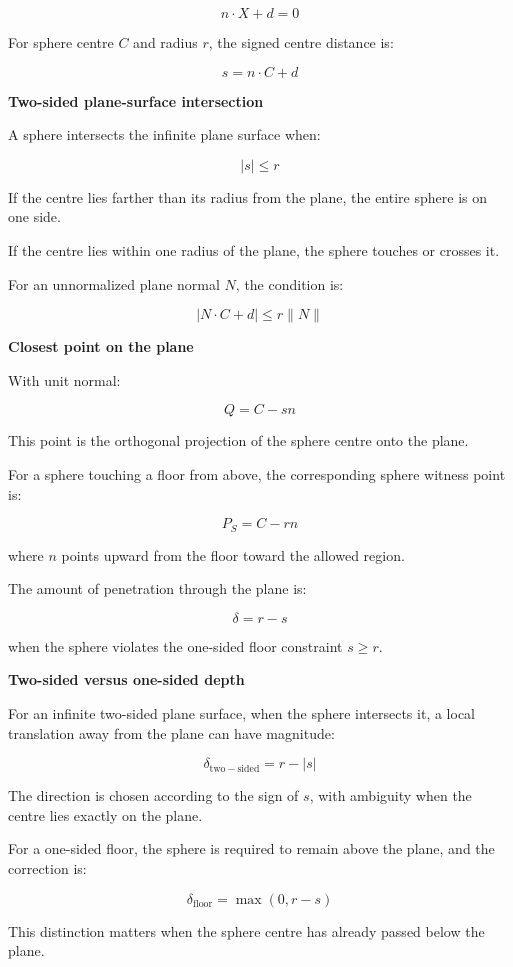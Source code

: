 \[
n\cdot X+d=0
\]

For sphere centre \(C\) and radius \(r\), the signed centre distance is:

\[
\boxed{ s=n\cdot C+d }
\]

\textbf{Two-sided plane-surface intersection}

A sphere intersects the infinite plane surface when:

\[
\boxed{ |s|\le r }
\]

If the centre lies farther than its radius from the plane, the entire sphere is on one side.

If the centre lies within one radius of the plane, the sphere touches or crosses it.

For an unnormalized plane normal \(N\), the condition is:

\[
\boxed{ |N\cdot C+d|\le r\|N\| }
\]

\textbf{Closest point on the plane}

With unit normal:

\[
\boxed{ Q=C-sn }
\]

This point is the orthogonal projection of the sphere centre onto the plane.

For a sphere touching a floor from above, the corresponding sphere witness point is:

\[
\boxed{ P_S=C-rn }
\]

where \(n\) points upward from the floor toward the allowed region.

The amount of penetration through the plane is:

\[
\boxed{ \delta=r-s }
\]

when the sphere violates the one-sided floor constraint \(s\ge r\).

\textbf{Two-sided versus one-sided depth}

For an infinite two-sided plane surface, when the sphere intersects it, a local translation away from the plane can have magnitude:

\[
\boxed{ \delta_{\mathrm{two-sided}}=r-|s| }
\]

The direction is chosen according to the sign of \(s\), with ambiguity when the centre lies exactly on the plane.

For a one-sided floor, the sphere is required to remain above the plane, and the correction is:

\[
\boxed{ \delta_{\mathrm{floor}}=\max(0,r-s) }
\]

This distinction matters when the sphere centre has already passed below the plane.

